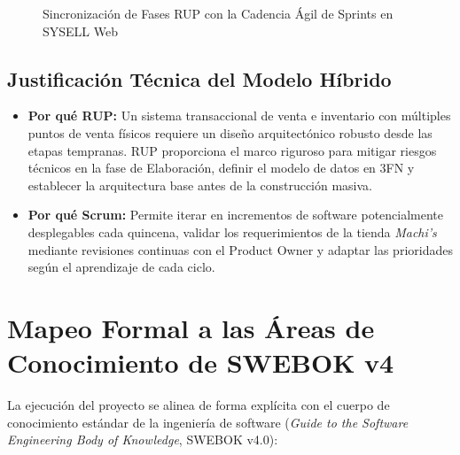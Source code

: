 \begin{figure}[H]
\caption{Sincronización de Fases RUP con la Cadencia Ágil de Sprints en SYSELL Web}
\label{fig:rup_scrum_sync}
\end{figure}

\subsection{Justificación Técnica del Modelo Híbrido}
\begin{itemize}
    \item \textbf{Por qué RUP:} Un sistema transaccional de venta e inventario con múltiples puntos de venta físicos requiere un diseño arquitectónico robusto desde las etapas tempranas. RUP proporciona el marco riguroso para mitigar riesgos técnicos en la fase de Elaboración, definir el modelo de datos en 3FN y establecer la arquitectura base antes de la construcción masiva.
    \item \textbf{Por qué Scrum:} Permite iterar en incrementos de software potencialmente desplegables cada quincena, validar los requerimientos de la tienda \textit{Machi's} mediante revisiones continuas con el Product Owner y adaptar las prioridades según el aprendizaje de cada ciclo.
\end{itemize}

\section{Mapeo Formal a las Áreas de Conocimiento de SWEBOK v4}
La ejecución del proyecto se alinea de forma explícita con el cuerpo de conocimiento estándar de la ingeniería de software (\textit{Guide to the Software Engineering Body of Knowledge}, SWEBOK v4.0):


